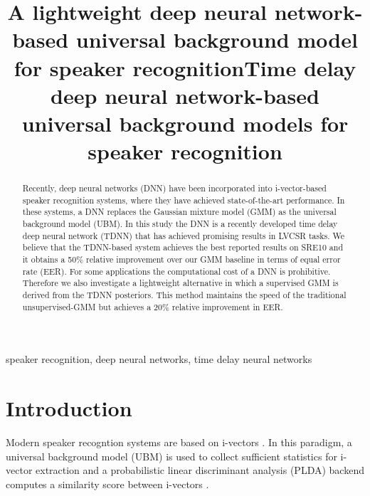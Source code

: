 \documentclass{article}
\title{A lightweight deep neural network-based universal background model for speaker recognition}
\title{Time delay deep neural network-based universal background models for speaker recognition}
\begin{document}
%
\maketitle
%
\begin{abstract}

Recently, deep neural networks (DNN) have been incorporated into i-vector-based speaker
recognition systems, where they have achieved state-of-the-art performance. In these
systems, a DNN replaces the Gaussian mixture model (GMM) as the universal background
model (UBM). In this study the DNN is a recently developed time delay deep neural network
(TDNN) that has achieved promising results in LVCSR tasks. 
We believe that the
TDNN-based system achieves the best reported results on SRE10 and it obtains a 50\% relative 
improvement over our GMM baseline in terms of equal error rate (EER). 
For some applications the computational cost of a DNN is prohibitive. 
Therefore we also investigate a lightweight alternative in which a supervised GMM is derived from
the TDNN posteriors. This method maintains the speed of the traditional unsupervised-GMM
but achieves a 20\% relative improvement in EER.
\end{abstract}
%
\begin{keywords}
speaker recognition, deep neural networks, time delay neural networks
\end{keywords}
%
\section{Introduction}
\label{sec:intro}

Modern speaker recogntion systems are based on i-vectors \cite{ivector}.
In this paradigm, a universal background model (UBM) is used to collect
sufficient statistics for i-vector extraction and a probabilistic 
linear discriminant analysis (PLDA) backend computes a similarity score between i-vectors
 \cite{plda_prince, brummer2010speaker, kenny2010bayesian, villalba2011towards, garcia2011analysis, garcia2012multicondition}.
\end{document}
